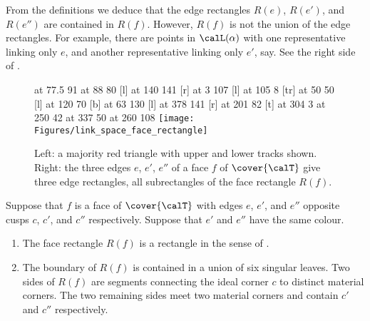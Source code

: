 \documentclass[12pt]{amsart}
\begin{document}
From the definitions we deduce that the edge rectangles $R(e)$, $R(e')$, and $R(e'')$ are contained in $R(f)$.  However, $R(f)$ is not the union of the edge rectangles.  For example, there are points in $\calL(\alpha)$ with one representative linking only $e$, and another representative linking only $e'$, say.  See the right side of .

\begin{figure}[htb]
\centering
{}
\tiny\hair 2pt
 at 77.5 91
 at 88 80
\small\hair 2pt
 [l] at 140 141
 [r] at 3 107
 [l] at 105 8
 [tr] at 50 50
 [l] at 120 70
 [b] at 63 130
 [l] at 378 141
 [r] at 201 82
 [t] at 304 3
 at 250 42
 at 337 50
 at 260 108
\endlabellist
\texttt{[image: Figures/link\_space\_face\_rectangle]}
\caption{Left: a majority red triangle with upper and lower tracks shown.
Right: the three edges $e$, $e'$, $e''$ of a face $f$ of $\cover{\calT}$ give three edge rectangles, all subrectangles of the face rectangle $R(f)$.}
\label{Fig:LinkSpaceFace}
\end{figure}

\begin{lemma}
\label{Lem:FaceRectangle}
Suppose that $f$ is a face of $\cover{\calT}$ with edges $e$, $e'$, and $e''$ opposite cusps $c$, $c'$, and $c''$ respectively.  Suppose that $e'$ and $e''$ have the same colour.  
\begin{enumerate}
\item
\label{Itm:FaceRectRect}
The face rectangle $R(f)$ is a rectangle in the sense of .
\item
\label{Itm:FaceRectBdy}
The boundary of $R(f)$ is contained in a union of six singular leaves.  Two sides of $R(f)$ are segments connecting the ideal corner $c$ to distinct material corners.  The two remaining sides meet two material corners and contain $c'$ and $c''$ respectively. 
\end{enumerate}
\end{lemma}
\end{document}
